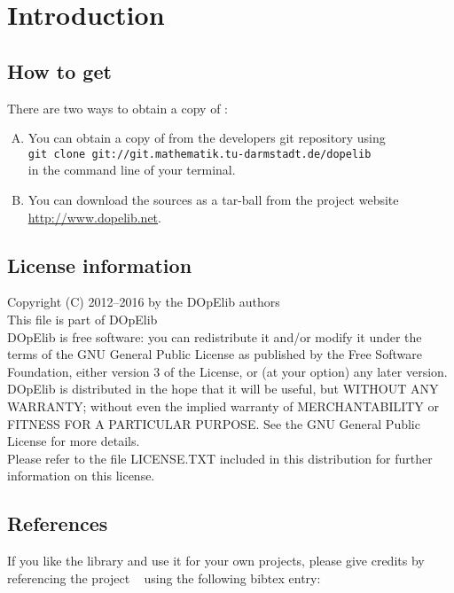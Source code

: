 \chapter{Introduction}\label{chap:intro}
\section{How to get \dope{}}\label{sec:obtain}
There are two ways to obtain a copy of \dope{}:\\

\begin{enumerate}[A)]
\item You can obtain a copy of \dope{} from the developers git repository using\\
\texttt{git clone git://git.mathematik.tu-darmstadt.de/dopelib} \\
in the command line of your terminal.


%
\item You can download the sources as a tar-ball from the project website\\ 
\url{http://www.dopelib.net}.
\end{enumerate}


\section{License information}
Copyright (C) 2012--2016 by the DOpElib authors\\[2mm]
%
This file is part of DOpElib\\[2mm]
%
DOpElib is free software: you can redistribute it
and/or modify it under the terms of the GNU General Public
License as published by the Free Software Foundation, either
version 3 of the License, or (at your option) any later
version.\\[2mm]
%
DOpElib is distributed in the hope that it will be
useful, but WITHOUT ANY WARRANTY; without even the implied
warranty of MERCHANTABILITY or FITNESS FOR A PARTICULAR
PURPOSE.  See the GNU General Public License for more
details.\\[2mm]
%
Please refer to the file LICENSE.TXT included in this distribution
for further information on this license.


\newpage
\section{References}
If you like the library and use it for your own projects, please give credits by 
referencing the project \dope{}~\cite{dope} using the following bibtex entry:

